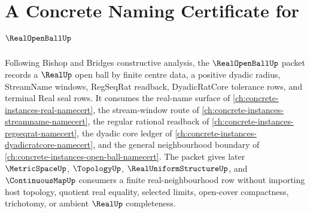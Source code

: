 \chapter{A Concrete Naming Certificate for $\RealOpenBallUp$}
\label{ch:concrete-instances-real-open-ball-namecert}

Following Bishop and Bridges constructive analysis, the $\RealOpenBallUp$ packet records a $\RealUp$ open ball by finite centre data, a positive dyadic radius, StreamName windows, RegSeqRat readback, DyadicRatCore tolerance rows, and terminal Real seal rows. It consumes the real-name surface of \autoref{ch:concrete-instances-real-namecert}, the stream-window route of \autoref{ch:concrete-instances-streamname-namecert}, the regular rational readback of \autoref{ch:concrete-instances-regseqrat-namecert}, the dyadic core ledger of \autoref{ch:concrete-instances-dyadicratcore-namecert}, and the general neighbourhood boundary of \autoref{ch:concrete-instances-open-ball-namecert}. The packet gives later $\MetricSpaceUp$, $\TopologyUp$, $\RealUniformStructureUp$, and $\ContinuousMapUp$ consumers a finite real-neighbourhood row without importing host topology, quotient real equality, selected limits, open-cover compactness, trichotomy, or ambient $\RealUp$ completeness.

